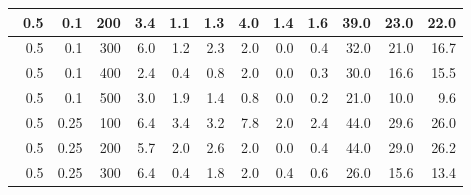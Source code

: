 \begin{longtable}{|r|r|r|r|r|r|r|r|r|r|r|r|}
    \hline \
    0.5                            & 0.1                     & 200                       & 3.4                       & 1.1                       & 1.3                       & 4.0                       & 1.4                       & 1.6                       & 39.0                      & 23.0                      & 22.0                      \\
    \hline \
    0.5                            & 0.1                     & 300                       & 6.0                       & 1.2                       & 2.3                       & 2.0                       & 0.0                       & 0.4                       & 32.0                      & 21.0                      & 16.7                       \\
    \hline \
    0.5                            & 0.1                    & 400                       & 2.4                       & 0.4                       & 0.8                       & 2.0                       & 0.0                       & 0.3                       & 30.0                      & 16.6                      & 15.5                      \\
    \hline \
    0.5                            & 0.1                    & 500                       & 3.0                       & 1.9                       & 1.4                       & 0.8                       & 0.0                       & 0.2                       & 21.0                      & 10.0                      & 9.6                      \\
    \hline \
    0.5                            & 0.25                    & 100                       & 6.4                       & 3.4                       & 3.2                       & 7.8                       & 2.0                       & 2.4                       & 44.0                      & 29.6                      & 26.0                      \\
    \hline \
    0.5                            & 0.25                    & 200                       & 5.7                       & 2.0                       & 2.6                       & 2.0                       & 0.0                       & 0.4                       & 44.0                      & 29.0                      & 26.2                      \\
    \hline \
    0.5                            & 0.25                    & 300                       & 6.4                       & 0.4                       & 1.8                       & 2.0                       & 0.4                       & 0.6                       & 26.0                      & 15.6                      & 13.4                      \\

\end{longtable}
